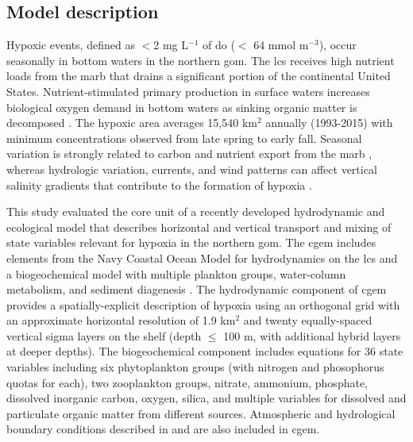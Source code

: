 \documentclass[letterpaper,12pt,oneside]{article}\usepackage[]{graphicx}\usepackage[]{color}
\begin{document}
\subsection{Model description}

Hypoxic events, defined  as $<$2 mg L$^{-1}$ of \ac{do} ($<$ 64 mmol m$^{-3}$), occur seasonally in bottom waters in the northern \ac{gom}.  The \ac{lcs} receives high nutrient loads from the \ac{marb} that drains a significant portion of the continental United States.  Nutrient-stimulated primary production in surface waters increases biological oxygen demand in bottom waters as sinking organic matter is decomposed \citep{Bierman94,Murrell13}.  The hypoxic area averages 15,540 km$^2$ annually (1993-2015) with minimum concentrations observed from late spring to early fall.  Seasonal variation is strongly related to carbon and nutrient export from the \ac{marb} \citep{Lohrenz08,Bianchi10}, whereas hydrologic variation, currents, and wind patterns can affect vertical salinity gradients that contribute to the formation of hypoxia \citep{Wiseman97,Paerl98,Obenour15}. 

This study evaluated the core unit of a recently developed hydrodynamic and ecological model that describes horizontal and vertical transport and mixing of state variables relevant for hypoxia in the northern \ac{gom}.  The \ac{cgem} includes elements from the Navy Coastal Ocean Model \citep{Martin00} for hydrodynamics on the \ac{lcs} and a biogeochemical model with multiple plankton groups, water-column metabolism, and sediment diagenesis \citep{Eldridge10}.  The hydrodynamic component of \ac{cgem} provides a spatially-explicit description of hypoxia using an orthogonal grid with an approximate horizontal resolution of 1.9 km$^2$ and twenty equally-spaced vertical sigma layers on the shelf (depth $\leq$ 100 m, with additional hybrid layers at deeper depths).  The biogeochemical component includes equations for 36 state variables including six phytoplankton groups (with nitrogen and phosophorus quotas for each), two zooplankton groups, nitrate, ammonium, phosphate, dissolved inorganic carbon, oxygen, silica, and multiple variables for dissolved and particulate organic matter from different sources.  Atmospheric and hydrological boundary conditions described in \citet{Hodur97} and \citet{Lehrter13} are also included in \ac{cgem}.
\end{document}
